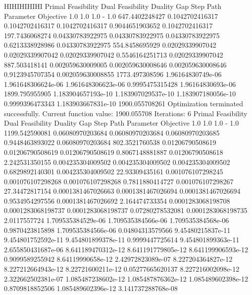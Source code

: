 \documentclass[letterpaper,10pt,english]{sphinxmanual}
\begin{document}
{
\begin{sphinxVerbatim}[commandchars=\\\{\}]
HIHIHIHIHI
Primal Feasibility  Dual Feasibility    Duality Gap         Step             Path Parameter      Objective
1.0                 1.0                 1.0                 -                1.0                 647.4402248427
0.1042702416317     0.1042702416317     0.1042702416317     0.9044651903652  0.1042702416317     197.7436068274
0.04330783922975    0.04330783922975    0.04330783922975    0.6213338928986  0.04330783922975    554.8458695929
0.02029339907042    0.02029339907042    0.02029339907042    0.5546164251713  0.02029339907042    887.503418141
0.002059630009005   0.002059630008646   0.002059630008646   0.9123945707354  0.002059630008855   1773.497308596
1.96164830749e-06   1.961648306624e-06  1.961648306623e-06  0.9995475315428  1.96164830693e-06   1899.795955905
1.183904657193e-10  1.183907029537e-10  1.183907180056e-10  0.9999396473343  1.183903667831e-10  1900.055708261
Optimization terminated successfully.
         Current function value: 1900.055708
         Iterations: 6
Primal Feasibility  Dual Feasibility    Duality Gap         Step             Path Parameter      Objective
1.0                 1.0                 1.0                 -                1.0                 1199.542590081
0.06080970203684    0.06080970203684    0.06080970203685    0.9448463893022  0.06080970203684    802.3521760538
0.01206790508619    0.01206790508619    0.01206790508619    0.8067148881887  0.01206790508618    2.242531350155
0.004235304009502   0.004235304009502   0.004235304009502   0.6829892140301  0.004235304009502   22.93309435161
0.001076107298245   0.001076107298268   0.001076107298268   0.7811880414727  0.001076107298267   27.34472817154
0.0001381467026663  0.0001381467026694  0.0001381467026694  0.9534954297556  0.0001381467026692  2.164474733354
0.0001283068198708  0.0001283068198737  0.0001283068198737  0.07280278532081 0.0001283068198735  2.0117557724
1.709535384529e-06  1.709535384566e-06  1.709535384568e-06  0.9870423815898  1.709535384566e-06  0.04804313579566
9.45480215837e-11   9.454801752592e-11  9.454801899378e-11  0.9999447725614  9.454801899363e-11  2.655850431687e-06
8.641189470312e-12  8.641191779805e-12  8.641199906593e-12  0.9099589255942  8.64119990658e-12   2.42972823089e-07
8.227204364827e-12  8.227212664943e-12  8.22721600211e-12   0.05277665620137 8.227216002098e-12  2.322662502381e-07
1.085487238602e-12  1.085487876362e-12  1.085489602398e-12  0.8709818852506  1.085489602396e-12  3.141737288768e-08

\end{sphinxVerbatim}}
\end{document}
